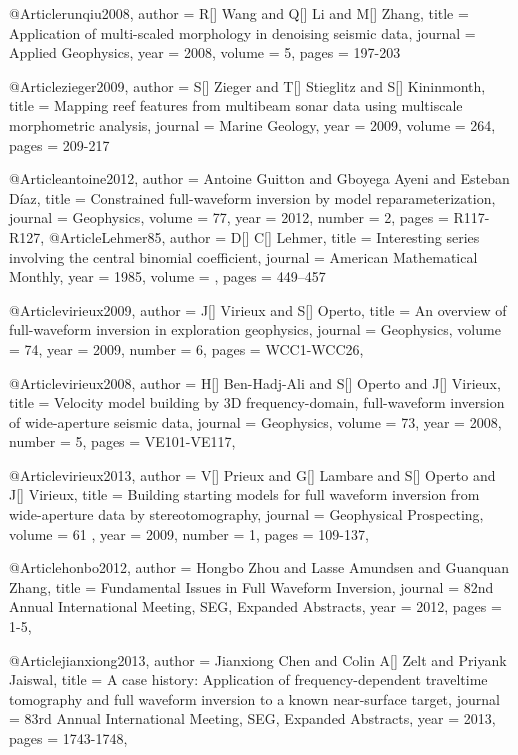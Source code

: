   
            @Article{runqiu2008,
  author = 	 {R[] Wang and Q[] Li and M[] Zhang},
  title = 	 {Application of multi-scaled morphology in denoising seismic data},
  journal = 	 {Applied Geophysics},
  year = 	 2008,
  volume = 	 5,
  pages = 	 {197-203}}    
 
             @Article{zieger2009,
  author = 	 {S[] Zieger and T[] Stieglitz and S[] Kininmonth},
  title = 	 {Mapping reef features from multibeam sonar data using multiscale morphometric analysis},
  journal = 	 {Marine Geology},
  year = 	 2009,
  volume = 	 264,
  pages = 	 {209-217}}   
  
@Article{antoine2012,
  author =	 { Antoine Guitton and Gboyega Ayeni and Esteban Díaz},
  title =	 {Constrained full-waveform inversion by model reparameterization},
  journal =	 {Geophysics},
  volume =	 77,
  year =	 2012,
  number =	 2,
  pages =	 {R117-R127},
}
@Article{Lehmer85,
  author = 	 {D[] C[] Lehmer},
  title = 	 {Interesting series involving the central binomial coefficient},
  journal = 	 {American Mathematical Monthly},
  year = 	 1985,
  volume =	 ,
  pages =	 {449–457}
}

@Article{virieux2009,
  author =	 { J[] Virieux and S[] Operto},
  title =	 {An overview of full-waveform inversion in exploration geophysics},
  journal =	 {Geophysics},
  volume =	 74,
  year =	 2009,
  number =	 6,
  pages =	 {WCC1-WCC26},
}

@Article{virieux2008,
  author =	 { H[] Ben-Hadj-Ali and S[] Operto and J[] Virieux},
  title =	 {Velocity model building by 3{D} frequency-domain, full-waveform inversion of wide-aperture seismic data},
  journal =	 {Geophysics},
  volume =	 73,
  year =	 2008,
  number =	 5,
  pages =	 {VE101-VE117},
}

@Article{virieux2013,
  author =	 { V[] Prieux and G[] Lambare  and S[] Operto and J[] Virieux},
  title =	 {Building starting models for full waveform inversion from wide-aperture data by stereotomography},
  journal =	 {Geophysical Prospecting},
  volume =	61 ,
  year =	 2009,
  number =	 1,
  pages =	 {109-137},
}



@Article{honbo2012,
  author = 	 {Hongbo Zhou and Lasse Amundsen and Guanquan Zhang},
  title = 	 {Fundamental Issues in Full Waveform Inversion},
  journal = 	 {82nd Annual International Meeting, SEG, Expanded Abstracts},
  year = 	 2012,
  pages =	 {1-5},
}

@Article{jianxiong2013,
  author = 	 {Jianxiong Chen and Colin A[] Zelt and Priyank Jaiswal},
  title = 	 {A case history: Application of frequency-dependent traveltime tomography and full waveform
inversion to a known near-surface target},
  journal = 	 {83rd Annual International Meeting, SEG, Expanded Abstracts},
  year = 	 2013,
  pages =	 {1743-1748},
}


